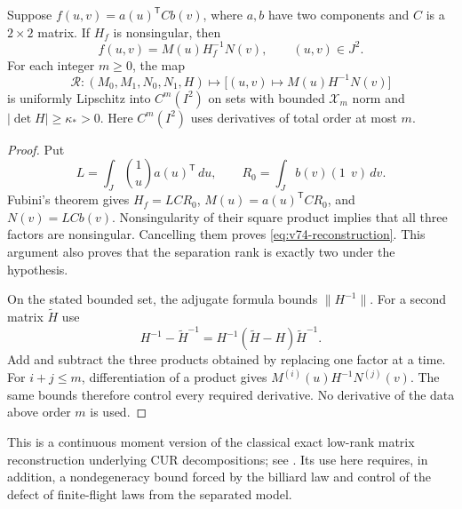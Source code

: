 \begin{lemma}\label{lem:v74-skeleton}
Suppose $f(u,v)=a(u)^{\mathsf T}Cb(v)$, where $a,b$ have two
components and $C$ is a $2\times2$ matrix.  If $H_f$ is nonsingular,
then
\begin{equation}\label{eq:v74-reconstruction}
                  f(u,v)=M(u)H_f^{-1}N(v),\qquad (u,v)\in J^2.
\end{equation}
For each integer $m\ge0$, the map
\[
 \mathcal R:(M_0,M_1,N_0,N_1,H)\longmapsto
                   \bigl[(u,v)\mapsto M(u)H^{-1}N(v)\bigr]
\]
is uniformly Lipschitz into $C^m(I^2)$ on sets with bounded
$\mathcal X_m$ norm and $|\det H|\ge\kappa_*>0$.
Here $C^m(I^2)$ uses derivatives of total order at most $m$.
\end{lemma}
\begin{proof}
Put
\[
 L=\int_J\binom{1}{u}a(u)^{\mathsf T}\,du,
 \qquad R_0=\int_J b(v)(1\ \ v)\,dv.
\]
Fubini's theorem gives $H_f=LCR_0$,
$M(u)=a(u)^{\mathsf T}CR_0$, and $N(v)=LCb(v)$.
Nonsingularity of their square product implies that all three factors
are nonsingular.  Cancelling them proves
\eqref{eq:v74-reconstruction}.  This argument also proves that the
separation rank is exactly two under the hypothesis.

On the stated bounded set, the adjugate formula bounds $\|H^{-1}\|$.
For a second matrix $\widetilde H$ use
\[
 H^{-1}-\widetilde H^{-1}
       =H^{-1}(\widetilde H-H)\widetilde H^{-1}.
\]
Add and subtract the three products obtained by replacing one factor
at a time.  For $i+j\le m$, differentiation of a product gives
$M^{(i)}(u)H^{-1}N^{(j)}(v)$.  The same bounds therefore control
every required derivative.  No derivative of the data above order $m$
is used.
\end{proof}

This is a continuous moment version of the classical exact low-rank
matrix reconstruction underlying CUR decompositions; see
\cite{HammHuang2019}.  Its use here requires, in addition, a
nondegeneracy bound forced by the billiard law and control of the defect
of finite-flight laws from the separated model.

